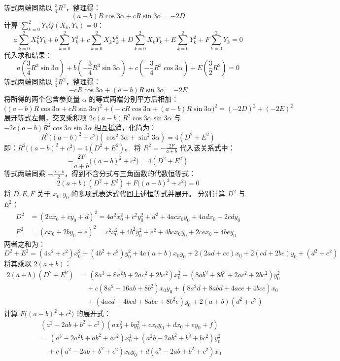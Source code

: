 \begin{solution}
等式两端同除以 $\frac{3}{4}R^2$，整理得：
$$ (a-b)R\cos 3\alpha + cR\sin 3\alpha = -2D $$
计算 $\sum_{k=0}^2 Y_k Q(X_k, Y_k) = 0$：
$$ a\sum_{k=0}^2 X_k^2 Y_k + b\sum_{k=0}^2 Y_k^3 + c\sum_{k=0}^2 X_k Y_k^2 + D\sum_{k=0}^2 X_k Y_k + E\sum_{k=0}^2 Y_k^2 + F\sum_{k=0}^2 Y_k = 0 $$
代入求和结果：
$$ a\left(\frac{3}{4}R^3 \sin 3\alpha\right) + b\left(-\frac{3}{4}R^3 \sin 3\alpha\right) + c\left(-\frac{3}{4}R^3 \cos 3\alpha\right) + E\left(\frac{3}{2}R^2\right) = 0 $$
等式两端同除以 $\frac{3}{4}R^2$，整理得：
$$ -cR\cos 3\alpha + (a-b)R\sin 3\alpha = -2E $$
将所得的两个包含参变量 $\alpha$ 的等式两端分别平方后相加：
$$ \big((a-b)R\cos 3\alpha + cR\sin 3\alpha\big)^2 + \big(-cR\cos 3\alpha + (a-b)R\sin 3\alpha\big)^2 = (-2D)^2 + (-2E)^2 $$
展开等式左侧，交叉乘积项 $2c(a-b)R^2\cos 3\alpha\sin 3\alpha$ 与 $-2c(a-b)R^2\cos 3\alpha\sin 3\alpha$ 相互抵消，化简为：
$$ R^2\big((a-b)^2 + c^2\big)(\cos^2 3\alpha + \sin^2 3\alpha) = 4(D^2 + E^2) $$
即：$R^2\big((a-b)^2 + c^2\big) = 4(D^2 + E^2)$。
将 $R^2 = -\frac{2F}{a+b}$ 代入该关系式中：
$$ -\frac{2F}{a+b}\big((a-b)^2 + c^2\big) = 4(D^2 + E^2) $$
等式两端同乘 $-\frac{a+b}{2}$，得到不含分式与三角函数的代数恒等式：
$$ 2(a+b)(D^2 + E^2) + F\big((a-b)^2 + c^2\big) = 0 $$
将 $D, E, F$ 关于 $x_0, y_0$ 的多项式表达式代回上述恒等式并展开。
分别计算 $D^2$ 与 $E^2$：
\begin{align*}
D^2 &= (2ax_0 + cy_0 + d)^2 = 4a^2 x_0^2 + c^2 y_0^2 + d^2 + 4ac x_0 y_0 + 4ad x_0 + 2cd y_0 \\
E^2 &= (cx_0 + 2by_0 + e)^2 = c^2 x_0^2 + 4b^2 y_0^2 + e^2 + 4bc x_0 y_0 + 2ce x_0 + 4be y_0
\end{align*}
两者之和为：
$$ D^2 + E^2 = (4a^2+c^2)x_0^2 + (4b^2+c^2)y_0^2 + 4c(a+b)x_0 y_0 + 2(2ad+ce)x_0 + 2(cd+2be)y_0 + (d^2+e^2) $$
将其乘以 $2(a+b)$：
\begin{align*}
2(a+b)(D^2 + E^2) &= (8a^3 + 8a^2b + 2ac^2 + 2bc^2)x_0^2 + (8ab^2 + 8b^3 + 2ac^2 + 2bc^2)y_0^2 \\
&\quad + c(8a^2 + 16ab + 8b^2)x_0 y_0 + (8a^2d + 8abd + 4ace + 4bce)x_0 \\
&\quad + (4acd + 4bcd + 8abe + 8b^2e)y_0 + 2(a+b)(d^2+e^2)
\end{align*}
计算 $F\big((a-b)^2 + c^2\big)$ 的展开式：
\begin{align*}
& (a^2 - 2ab + b^2 + c^2)(ax_0^2 + by_0^2 + cx_0 y_0 + dx_0 + ey_0 + f) \\
&= (a^3 - 2a^2b + ab^2 + ac^2)x_0^2 + (a^2b - 2ab^2 + b^3 + bc^2)y_0^2 \\
&\quad + c(a^2 - 2ab + b^2 + c^2)x_0 y_0 + d(a^2 - 2ab + b^2 + c^2)x_0 \\

\end{align*}
\end{solution}
